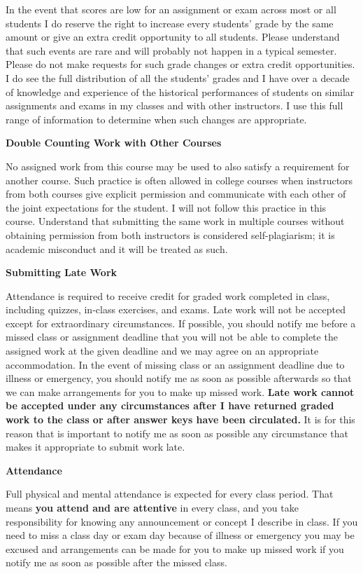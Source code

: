 \documentclass[10pt]{article}
\newcommand{\toprule}{\par\vspace*{5pt}\noindent{\hrule\hfill}\par\vspace*{1pt}}
\newcommand{\botrule}{\par\noindent{\hrule\hfill}\par}
\begin{document}
In the event that scores are low for an assignment or exam across most or all students I do reserve the right to increase every students' grade by the same amount or give an extra credit opportunity to all students.  Please understand that such events are rare and will probably not happen in a typical semester.  Please do not make requests for such grade changes or extra credit opportunities.  I do see the full distribution of all the students' grades and I have over a decade of knowledge and experience of the historical performances of students on similar assignments and exams in my classes and with other instructors.  I use this full range of information to determine when such changes are appropriate.\\

\botrule \textbf{Double Counting Work with Other Courses} \toprule
No assigned work from this course may be used to also satisfy a requirement for another course.  Such practice is often allowed in college courses when instructors from both courses give explicit permission and communicate with each other of the joint expectations for the student.  I will not follow this practice in this course.  Understand that submitting the same work in multiple courses without obtaining permission from both instructors is considered self-plagiarism; it is academic misconduct and it will be treated as such.\\

\botrule \textbf{Submitting Late Work} \toprule
Attendance is required to receive credit for graded work completed in class, including quizzes, in-class exercises, and exams.  Late work will not be accepted except for extraordinary circumstances.  If possible, you should notify me before a missed class or assignment deadline that you will not be able to complete the assigned work at the given deadline and we may agree on an appropriate accommodation.  In the event of missing class or an assignment deadline due to illness or emergency, you should notify me as soon as possible afterwards so that we can make arrangements for you to make up missed work.  \textbf{Late work cannot be accepted under any circumstances after I have returned graded work to the class or after answer keys have been circulated.}  It is for this reason that is important to notify me as soon as possible any circumstance that makes it appropriate to submit work late.\\

\botrule \textbf{Attendance} \toprule
Full physical and mental attendance is expected for every class period. That means \textbf{you attend and are attentive} in every class, and you take responsibility for knowing any announcement or concept I describe in class.  If you need to miss a class day or exam day because of illness or emergency you may be excused and arrangements can be made for you to make up missed work if you notify me as soon as possible after the missed class.  \\
\end{document}
